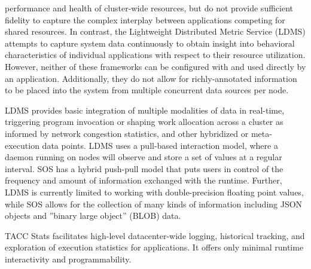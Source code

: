 performance and health of cluster-wide resources, but do not provide
sufficient fidelity to capture the complex interplay between
applications competing for shared resources.
%
In contrast, the Lightweight Distributed Metric Service
\cite{agelastos2014lightweight} (LDMS) attempts to capture system data
continuously to obtain insight into behavioral characteristics of
individual applications with respect to their resource utilization.
%
%
However, neither of these frameworks can be configured with and used
directly by an application.
%
Additionally, they do not allow for richly-annotated information to be
placed into the system from multiple concurrent data sources per node.
%
\par
%
LDMS provides basic integration of multiple modalities of data in
real-time, triggering program invocation or shaping work allocation
across a cluster as informed by network congestion statistics, and
other hybridized or meta-execution data points.
%
LDMS uses a pull-based interaction model, where a daemon running on
nodes will observe and store a set of values at a regular interval.
%
SOS has a hybrid push-pull model that puts users in control of the
frequency and amount of information exchanged with the runtime.
%
Further, LDMS is currently limited to working with double-precision
floating point values, while SOS allows for the collection of many
kinds of information including JSON objects and ''binary large
object'' (BLOB) data.
%
\par
%
TACC Stats \cite{evans2014comprehensive} facilitates high-level
datacenter-wide logging, historical tracking, and exploration of
execution statistics for applications.  It offers only minimal
runtime interactivity and programmability.
%



